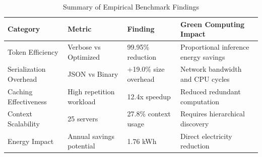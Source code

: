 
\begin{table}[t]
\centering
\caption{Summary of Empirical Benchmark Findings}
\label{tab:benchmark_summary}
\begin{tabular}{p{4cm}p{4cm}p{4cm}p{4cm}}
\toprule
\textbf{Category} & \textbf{Metric} & \textbf{Finding} & \textbf{Green Computing Impact} \\
\midrule
Token Efficiency & Verbose vs Optimized & 99.95\% reduction & Proportional inference energy savings \\
\addlinespace
Serialization Overhead & JSON vs Binary & +19.0\% size overhead & Network bandwidth and CPU cycles \\
\addlinespace
Caching Effectiveness & High repetition workload & 12.4x speedup & Reduced redundant computation \\
\addlinespace
Context Scalability & 25 servers & 27.8\% context usage & Requires hierarchical discovery \\
\addlinespace
Energy Impact & Annual savings potential & 1.76 kWh & Direct electricity reduction \\
\bottomrule
\end{tabular}
\end{table}
